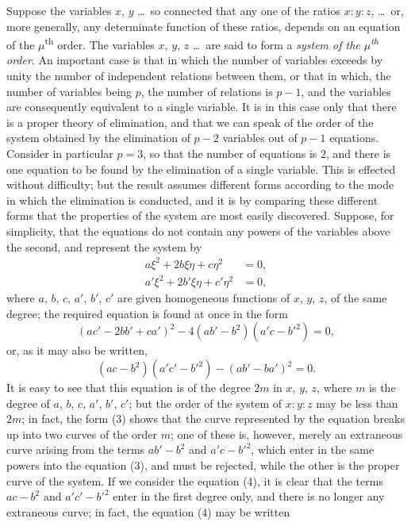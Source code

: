 \documentclass[12pt,a4paper]{article}
\begin{document}
\bigskip

Suppose the variables $x$, $y$ \dots\ so connected that any one of the ratios $x : y : z$, \dots\ or, more generally, any determinate function of these ratios, depends on an equation of the $\mu$\textsuperscript{th} order. The variables $x$, $y$, $z$ \dots\ are said to form a \textit{system of the $\mu$\textsuperscript{th} order}. An important case is that in which the number of variables exceeds by unity the number of independent relations between them, or that in which, the number of variables being $p$, the number of relations is $p - 1$, and the variables are consequently equivalent to a single variable. It is in this case only that there is a proper theory of elimination, and that we can speak of the order of the system obtained by the elimination of $p - 2$ variables out of $p - 1$ equations. Consider in particular $p = 3$, so that the number of equations is 2, and there is one equation to be found by the elimination of a single variable. This is effected without difficulty; but the result assumes different forms according to the mode in which the elimination is conducted, and it is by comparing these different forms that the properties of the system are most easily discovered. Suppose, for simplicity, that the equations do not contain any powers of the variables above the second, and represent the system by
\begin{align}
a\xi^2 + 2b\xi\eta + c\eta^2 &= 0, \tag{1} \\
a'\xi^2 + 2b'\xi\eta + c'\eta^2 &= 0, \tag{2}
\end{align}
where $a$, $b$, $c$, $a'$, $b'$, $c'$ are given homogeneous functions of $x$, $y$, $z$, of the same degree; the required equation is found at once in the form
\begin{equation}
(ac' - 2bb' + ca')^2 - 4(ab' - b^2)(a'c - b'^2) = 0, \tag{3}
\end{equation}
or, as it may also be written,
\begin{equation}
(ac - b^2)(a'c' - b'^2) - (ab' - ba')^2 = 0. \tag{4}
\end{equation}
It is easy to see that this equation is of the degree $2m$ in $x$, $y$, $z$, where $m$ is the degree of $a$, $b$, $c$, $a'$, $b'$, $c'$; but the order of the system of $x : y : z$ may be less than $2m$; in fact, the form (3) shows that the curve represented by the equation breaks up into two curves of the order $m$; one of these is, however, merely an extraneous curve arising from the terms $ab' - b^2$ and $a'c - b'^2$, which enter in the same powers into the equation (3), and must be rejected, while the other is the proper curve of the system. If we consider the equation (4), it is clear that the terms $ac - b^2$ and $a'c' - b'^2$ enter in the first degree only, and there is no longer any extraneous curve; in fact, the equation (4) may be written
\end{document}
